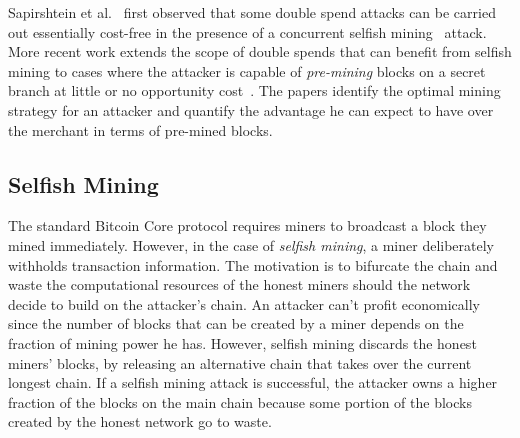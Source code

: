 Sapirshtein et al.~\cite{sapirshtein:2015} first observed that some double spend attacks can be carried out essentially cost-free in the presence of a concurrent selfish mining~\cite{eyal:2014} attack. 
More recent work extends the scope of double spends that can benefit from selfish mining to cases where the attacker is capable of \emph{pre-mining} blocks on a secret branch at little or no opportunity cost~\cite{Sompolinsky:2016}. The papers identify the optimal mining strategy for an attacker and quantify the advantage he can expect to have over the merchant in terms of pre-mined blocks.


\subsection{Selfish Mining}

The standard Bitcoin Core protocol requires miners to broadcast a block they mined immediately. However, in the case of {\em selfish mining}, a miner deliberately withholds transaction information. The motivation is to bifurcate the chain and waste the computational resources of the honest miners should the network decide to build on the attacker's chain. An attacker can't profit economically since the number of blocks that can be created by a miner depends on the fraction of mining power he has. However, selfish mining discards the honest miners' blocks, by releasing an alternative chain that takes over the current longest chain. If a selfish mining attack is successful, the attacker owns a higher fraction of the blocks on the main chain because some portion of the blocks created by the honest network go to waste.


